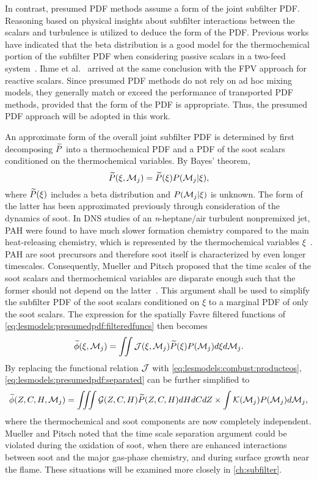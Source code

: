 In contrast, presumed PDF methods assume a form of the joint subfilter PDF. Reasoning based on physical insights about subfilter interactions between the scalars and turbulence is utilized to deduce the form of the PDF. Previous works have indicated that the beta distribution is a good model for the thermochemical portion of the subfilter PDF when considering passive scalars in a two-feed system~\cite{cook1994,jimenez1997,wall2000}. Ihme et al.~\cite{ihme2005} arrived at the same conclusion with the FPV approach for reactive scalars. Since presumed PDF methods do not rely on ad hoc mixing models, they generally match or exceed the performance of transported PDF methods, provided that the form of the PDF is appropriate. Thus, the presumed PDF approach will be adopted in this work.

An approximate form of the overall joint subfilter PDF is determined by first decomposing $\widetilde{P}$ into a thermochemical PDF and a PDF of the soot scalars conditioned on the thermochemical variables. By Bayes' theorem,
\begin{equation}\label{eq:lesmodels:presumedpdf:bayes}
  \widetilde{P}(\xi,\mathcal{M}_j) = \widetilde{P}(\xi)P(\mathcal{M}_j|\xi),
\end{equation}
where $\widetilde{P}(\xi)$ includes a beta distribution and $P(\mathcal{M}_j|\xi)$ is unknown. The form of the latter has been approximated previously through consideration of the dynamics of soot. In DNS studies of an \textit{n}-heptane/air turbulent nonpremixed jet, PAH were found to have much slower formation chemistry compared to the main heat-releasing chemistry, which is represented by the thermochemical variables $\xi$~\cite{attili2014,bisetti2012}. PAH are soot precursors and therefore soot itself is characterized by even longer timescales. Consequently, Mueller and Pitsch proposed that the time scales of the soot scalars and thermochemical variables are disparate enough such that the former should not depend on the latter~\cite{subfilterpdf2011}. This argument shall be used to simplify the subfilter PDF of the soot scalars conditioned on $\xi$ to a marginal PDF of only the soot scalars. The expression for the spatially Favre filtered functions of \cref{eq:lesmodels:presumedpdf:filteredfuncs} then becomes
\begin{equation}\label{eq:lesmodels:presumedpdf:separated}
  \widetilde{\phi}(\xi,\mathcal{M}_j) = \iint \mathcal{J}(\xi,\mathcal{M}_j)\widetilde{P}(\xi)P(\mathcal{M}_j) d\xi d\mathcal{M}_j.
\end{equation}
By replacing the functional relation $\mathcal{J}$ with \cref{eq:lesmodels:combust:producteos}, \cref{eq:lesmodels:presumedpdf:separated} can be further simplified to
\begin{equation}\label{eq:lesmodels:presumedpdf:indep}
  \widetilde{\phi}(Z,C,H,\mathcal{M}_j) = \iiint \mathcal{G}(Z,C,H)\widetilde{P}(Z,C,H) dHdCdZ \times \int \mathcal{K}(\mathcal{M}_j)P(\mathcal{M}_j) d\mathcal{M}_j,
\end{equation}
where the thermochemical and soot components are now completely independent. Mueller and Pitsch noted that the time scale separation argument could be violated during the oxidation of soot, when there are enhanced interactions between soot and the major gas-phase chemistry, and during surface growth near the flame. These situations will be examined more closely in \cref{ch:subfilter}.

